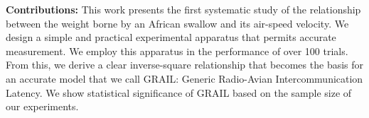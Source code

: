 \textbf{Contributions:} This work presents the first systematic study of the relationship between the weight borne by an African swallow and its air-speed velocity.  We design a simple and practical experimental apparatus that permits accurate measurement.  We employ this apparatus in the performance of over 100 trials.  From this, we derive a clear inverse-square relationship that becomes the basis for an accurate model that we call GRAIL: Generic Radio-Avian Intercommunication Latency.  We show statistical significance of GRAIL based on the sample size of our experiments.
